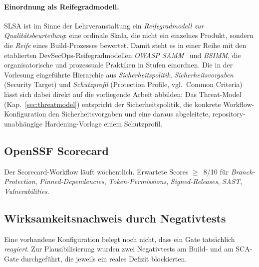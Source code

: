 \documentclass[12pt, a4paper]{scrartcl}
\begin{document}
\paragraph{Einordnung als Reifegradmodell.}
SLSA ist im Sinne der Lehrveranstaltung ein \emph{Reifegradmodell zur
Qualitätsbeurteilung}: eine ordinale Skala, die nicht ein einzelnes
Produkt, sondern die \emph{Reife} eines Build-Prozesses bewertet. Damit
steht es in einer Reihe mit den etablierten DevSecOps-Reifegradmodellen
\emph{OWASP SAMM}~\cite{samm} und \emph{BSIMM}, die organisatorische und
prozessuale Praktiken in Stufen einordnen. Die in der Vorlesung
eingeführte Hierarchie aus \emph{Sicherheitspolitik},
\emph{Sicherheitsvorgaben} (Security Target) und \emph{Schutzprofil}
(Protection Profile, vgl.\ Common Criteria) lässt sich dabei direkt auf
die vorliegende Arbeit abbilden: Das Threat-Model
(Kap.~\ref{sec:threatmodel}) entspricht der Sicherheitspolitik, die
konkrete Workflow-Konfiguration den Sicherheitsvorgaben und eine daraus
abgeleitete, repository-unabhängige Hardening-Vorlage einem Schutzprofil.

\subsection{OpenSSF Scorecard}\label{sec:scorecard}
Der Scorecard-Workflow läuft wöchentlich. Erwartete Scores $\geq$~8/10 für
\emph{Branch-Protection}, \emph{Pinned-Dependencies}, \emph{Token-Permissions},
\emph{Signed-Releases}, \emph{SAST}, \emph{Vulnerabilities}.

\subsection{Wirksamkeitsnachweis durch Negativtests}\label{sec:negtests}
Eine vorhandene Konfiguration belegt noch nicht, dass ein Gate
tatsächlich \emph{reagiert}. Zur Plausibilisierung wurden zwei
Negativtests am Build- und am SCA-Gate durchgeführt, die jeweils ein
reales Defizit blockierten.
\end{document}
